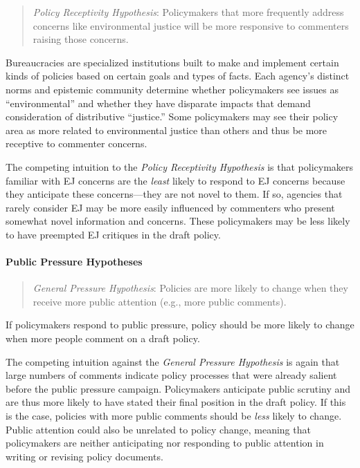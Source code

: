 \documentclass[
      12pt,
        ]{article}
\begin{document}
\begin{quote}
\emph{Policy Receptivity Hypothesis}: Policymakers that more frequently address concerns like environmental justice will be more responsive to commenters raising those concerns.
\end{quote}

Bureaucracies are specialized institutions built to make and implement certain kinds of policies based on certain goals and types of facts. Each agency's distinct norms and epistemic community determine whether policymakers see issues as ``environmental'' and whether they have disparate impacts that demand consideration of distributive ``justice.'' Some policymakers may see their policy area as more related to environmental justice than others and thus be more receptive to commenter concerns.

The competing intuition to the \emph{Policy Receptivity Hypothesis} is that policymakers familiar with EJ concerns are the \emph{least} likely to respond to EJ concerns because they anticipate these concerns---they are not novel to them. If so, agencies that rarely consider EJ may be more easily influenced by commenters who present somewhat novel information and concerns. These policymakers may be less likely to have preempted EJ critiques in the draft policy.

\hypertarget{public-pressure-hypotheses}{%
\paragraph{Public Pressure Hypotheses}\label{public-pressure-hypotheses}}

\begin{quote}
\emph{General Pressure Hypothesis}: Policies are more likely to change when they receive more public attention (e.g., more public comments).
\end{quote}

If policymakers respond to public pressure, policy should be more likely to change when more people comment on a draft policy.

The competing intuition against the \emph{General Pressure Hypothesis} is again that large numbers of comments indicate policy processes that were already salient before the public pressure campaign. Policymakers anticipate public scrutiny and are thus more likely to have stated their final position in the draft policy. If this is the case, policies with more public comments should be \emph{less} likely to change. Public attention could also be unrelated to policy change, meaning that policymakers are neither anticipating nor responding to public attention in writing or revising policy documents.
\end{document}
